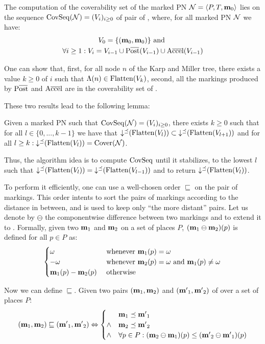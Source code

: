 The computation of the coverability set of the marked \ac{PN} $\mathcal{N} = \langle P,T, \mathbf{m}_0\rangle$ lies on the sequence $\operatorname{CovSeq}(\mathcal{N}) = (V_i)_{i \geq 0}$ of pair of \omarks, where, for all marked \ac{PN} $\mathcal{N}$ we have:
\begin{gather*}
  V_0 = \{(\mari, \mari)\} \text{ and } \\
  \forall i \geq 1 : V_i = V_{i-1} \cup \Postb(V_{i-1}) \cup \Accelb(V_{i-1})
\end{gather*}

One can show that,
first, for all node $n$ of the Karp and Miller tree, there exists a value $k \geq 0$ of $i$ such that $\Lambda(n) \in \operatorname{Flatten}(V_k)$,
second, all the markings produced by $\Postb$ and $\operatorname{A\overline{cce}l}$ are in the coverability set of \N.

These two results lead to the following lemma:
\begin{lemm}
  Given a marked \ac{PN} \N such that $\operatorname{CovSeq}(\mathcal{N}) = (V_i)_{i \geq 0}$,
  there exists $k \geq 0$ such that for all $l \in \{0, ..., k-1\}$ we have that $\operatorname{\downarrow^\preceq}(\operatorname{Flatten}(V_l)) \subset \operatorname{\downarrow^\preceq}(\operatorname{Flatten}(V_{l+1}))$
  and for all $l \geq k : \operatorname{\downarrow^\preceq}(\operatorname{Flatten}(V_l)) = \operatorname{Cover}(\mathcal{N})$.
\end{lemm}

Thus, the algorithm idea is to compute $\operatorname{CovSeq}$ until it stabilizes,  to the lowest $l$ such that $\operatorname{\downarrow^\preceq}(\operatorname{Flatten}(V_l)) = \operatorname{\downarrow^\preceq}(\operatorname{Flatten}(V_{l-1}))$ and to return $\operatorname{\downarrow^\preceq}(\operatorname{Flatten}(V_l))$.

To perform it efficiently, one can use a well-chosen order $\sqsubseteq$ on the pair of markings.
This order intents to sort the pairs of markings according to the distance in between, and is used to keep only ``the more distant'' pairs.
Let us denote by $\ominus$ the componentwise difference between two markings and to extend it to \omarks.
Formally, given two \omarks $\mathbf{m}_1$ and $\mathbf{m}_2$ on a set of places $P$, $(\mathbf{m}_1 \ominus \mathbf{m}_2)(p)$ is defined for all $p \in P$ as:
\[
  \begin{cases}
    \omega & \text{ whenever } \mathbf{m}_1(p) = \omega \\
    -\omega & \text{ whenever } \mathbf{m}_2(p) = \omega \text{ and } \mathbf{m}_1(p) \neq \omega \\
    \mathbf{m}_1(p) - \mathbf{m}_2(p) & \text{ otherwise}
  \end{cases}
\]

Now we can define $\sqsubseteq$.
Given two pairs $(\mathbf{m}_1, \mathbf{m}_2)$ and $(\mathbf{m'}_1, \mathbf{m'}_2)$ of \omarks over a set of places $P$:
\[
  (\mathbf{m}_1, \mathbf{m}_2) \sqsubseteq (\mathbf{m'}_1, \mathbf{m'}_2) \Leftrightarrow
  \begin{cases}
    & \mathbf{m}_1 \preceq \mathbf{m'}_1 \\
    \wedge & \mathbf{m}_2 \preceq \mathbf{m'}_2 \\
    \wedge & \forall p \in P : (\mathbf{m}_2 \ominus \mathbf{m}_1)(p) \leq (\mathbf{m'}_2 \ominus \mathbf{m'}_1)(p)
  \end{cases}
\]

